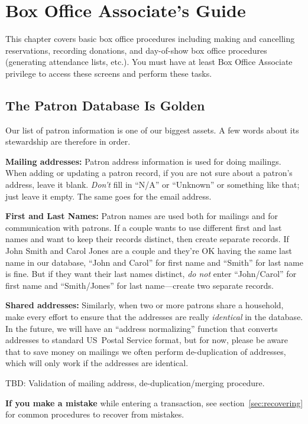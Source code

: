 \section{Box Office Associate's Guide}
\label{chap:boa}

This chapter covers basic box office procedures including making and
cancelling reservations, recording donations, and day-of-show box office
procedures (generating attendance lists, etc.).  You must have at least
Box Office Associate privilege to access these screens and perform these
tasks. 

\subsection{The Patron Database Is Golden}
\label{sec:patrondb}

Our list of patron information is one of our biggest assets.  A few
words about its stewardship are therefore in order.

\textbf{Mailing addresses:} Patron address information is used for doing
mailings. When adding or updating a patron record, if you are not sure
about a patron's address, leave it blank. \emph{Don't} fill in ``N/A''
or ``Unknown'' or something like that; just leave it empty.  The same
goes for the email address.

\textbf{First and Last Names:} Patron names are used both for mailings
and for communication with patrons.  If a couple wants to use different
first and last names and want to keep their records distinct, then
create separate records.  If John Smith and Carol Jones are a couple and
they're OK having the same last name in our database, ``John and Carol''
for first name and ``Smith'' for last name is fine.  But if they want
their last names distinct, \emph{do not} enter ``John/Carol'' for first name
and ``Smith/Jones'' for last name---create two separate records.

\textbf{Shared addresses:} Similarly, when two or more patrons share a
household, make every effort to ensure that the addresses are really
\emph{identical} in the database.  In the future, we will have an
``address normalizing'' function that converts addresses to standard
US~Postal Service format, but for now, please be aware that to save
money on mailings we often perform de-duplication of addresses, which
will only work if the addresses are identical.

TBD: Validation of mailing address, de-duplication/merging procedure.

\textbf{If you make a mistake} while entering a transaction, see
section~\ref{sec:recovering} for common procedures to recover from mistakes.

